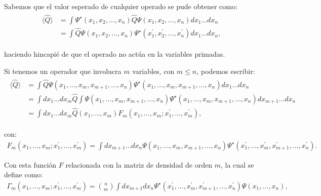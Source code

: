 Sabemos que el valor esperado de cualquier operado se pude obtener como:
%
\begin{align}
	\begin{split}
    \langle \widehat{Q} \rangle & = \int\Psi^{\star}(x_{1},x_{2},\ldots,x_{n}) \widehat{Q} \Psi(x_{1},x_{2},\ldots,x_{n}) dx_{1}\ldots dx_{n} \\ 
	                              & = \int\widehat{Q}\Psi(x_{1},x_{2},\ldots,x_{n}) \Psi^{\star}(x^{\prime}_{1},x^{\prime}_{2},\ldots,x^{\prime}_{n}) dx_{1}\ldots dx_{n} ,
	\end{split}
\end{align}

\noindent haciendo hincapié de que el operado no actúa en la variables primadas.

Si tenemos un operador que involucra $m$ variables, con $m\le n$, podemos escribir:
%
\small
\begin{align}
	\begin{split}
    \langle \widehat{Q} \rangle & = \int\widehat{Q}\Psi(x_{1},\ldots , x_{m}, x_{m+1}, \ldots , x_{n})
    \Psi^{\star}(x_{1},\ldots , x_{m}, x_{m+1}, \ldots , x_{n}) dx_{1}\ldots dx_{n} \\
	& =\int dx_{1}\ldots dx_{m} \widehat{Q}\int\Psi(x_{1},\ldots , x_{m}, x_{m+1}, \ldots , x_{n})
	  \Psi^{\star}(x_{1},\ldots , x_{m}, x_{m+1}, \ldots , x_{n}) dx_{m+1}\ldots dx_{n}\\
	& =\int dx_{1}\ldots dx_{m} \widehat{Q} (x_{1}, \ldots , x_{m}) F_{m}
	  (x_{1}, \ldots , x_{m}; x^{\prime}_{1}, \ldots , x^{\prime}_{m}),
	\end{split}
\end{align}
\normalsize

\noindent con:
%
\footnotesize
\begin{align}
  F_{m}(x_{1}, \ldots , x_{m}; x^{\prime}_{1}, \ldots , x^{\prime}_{m}) =
  \int dx_{m+1}\ldots dx_{n} \Psi(x_{1},\ldots , x_{m}, x_{m+1}, \ldots , x_{n})
  \Psi^{\star}(x^{\prime}_{1},\ldots , x^{\prime}_{m}, x^{\prime}_{m+1}, \ldots , x^{\prime}_{n}).
\end{align}
\normalsize

Con esta función $F$ relacionada con la matriz de densidad de orden $m$, la cual se define como:
%
\begin{align}
  \Gamma_{m}(x_{1}, \ldots , x_{m}; x^{\prime}_{1}, \ldots , x^{\prime}_{m}) = {n \choose m}\int dx_{m+1}
  dx_{n} \Psi^{\star}(x^{\prime}_{1},\ldots , x^{\prime}_{m}, x^{\prime}_{m+1}, \ldots , x^{\prime}_{n}) \Psi(x_{1},\ldots ,x_{n}),
\end{align}

